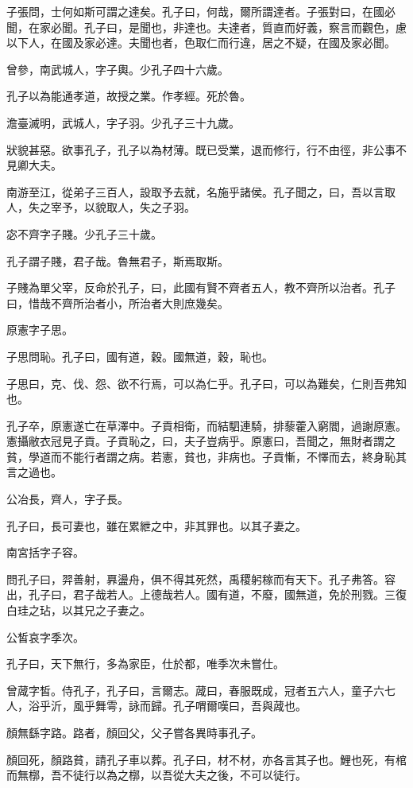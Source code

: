 子張問，士何如斯可謂之達矣。孔子曰，何哉，爾所謂達者。子張對曰，在國必聞，在家必聞。孔子曰，是聞也，非達也。夫達者，質直而好義，察言而觀色，慮以下人，在國及家必達。夫聞也者，色取仁而行違，居之不疑，在國及家必聞。

曾參，南武城人，字子輿。少孔子四十六歲。

孔子以為能通孝道，故授之業。作孝經。死於魯。

澹臺滅明，武城人，字子羽。少孔子三十九歲。

狀貌甚惡。欲事孔子，孔子以為材薄。既已受業，退而修行，行不由徑，非公事不見卿大夫。

南游至江，從弟子三百人，設取予去就，名施乎諸侯。孔子聞之，曰，吾以言取人，失之宰予，以貌取人，失之子羽。

宓不齊字子賤。少孔子三十歲。

孔子謂子賤，君子哉。魯無君子，斯焉取斯。

子賤為單父宰，反命於孔子，曰，此國有賢不齊者五人，教不齊所以治者。孔子曰，惜哉不齊所治者小，所治者大則庶幾矣。

原憲字子思。

子思問恥。孔子曰，國有道，穀。國無道，穀，恥也。

子思曰，克、伐、怨、欲不行焉，可以為仁乎。孔子曰，可以為難矣，仁則吾弗知也。

孔子卒，原憲遂亡在草澤中。子貢相衛，而結駟連騎，排藜藿入窮閻，過謝原憲。憲攝敝衣冠見子貢。子貢恥之，曰，夫子豈病乎。原憲曰，吾聞之，無財者謂之貧，學道而不能行者謂之病。若憲，貧也，非病也。子貢慚，不懌而去，終身恥其言之過也。

公冶長，齊人，字子長。

孔子曰，長可妻也，雖在累紲之中，非其罪也。以其子妻之。

南宮括字子容。

問孔子曰，羿善射，奡盪舟，俱不得其死然，禹稷躬稼而有天下。孔子弗答。容出，孔子曰，君子哉若人。上德哉若人。國有道，不廢，國無道，免於刑戮。三復白珪之玷，以其兄之子妻之。

公皙哀字季次。

孔子曰，天下無行，多為家臣，仕於都，唯季次未嘗仕。

曾蒧字皙。侍孔子，孔子曰，言爾志。蒧曰，春服既成，冠者五六人，童子六七人，浴乎沂，風乎舞雩，詠而歸。孔子喟爾嘆曰，吾與蒧也。

顏無繇字路。路者，顏回父，父子嘗各異時事孔子。

顏回死，顏路貧，請孔子車以葬。孔子曰，材不材，亦各言其子也。鯉也死，有棺而無槨，吾不徒行以為之槨，以吾從大夫之後，不可以徒行。


